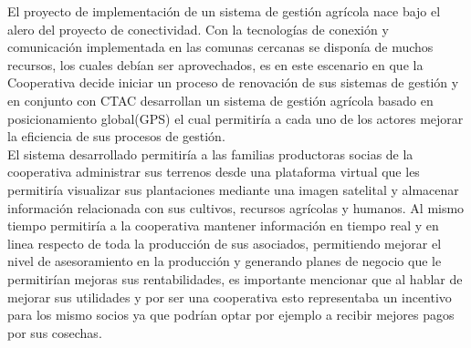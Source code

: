 El proyecto de implementación de un sistema de gestión agrícola nace bajo el alero del proyecto de conectividad. Con la tecnologías de conexión y comunicación implementada en las comunas cercanas se disponía de muchos recursos, los cuales debían ser aprovechados, es en este escenario en que la Cooperativa decide iniciar un proceso de renovación de sus sistemas de gestión y en conjunto con CTAC desarrollan un sistema de gestión agrícola basado en posicionamiento global(GPS) el cual permitiría a cada uno de los actores mejorar la eficiencia de sus procesos de gestión.\\

El sistema desarrollado permitiría a las familias productoras socias de la cooperativa administrar sus terrenos desde una plataforma virtual que les permitiría visualizar sus plantaciones mediante una imagen satelital y almacenar información relacionada con sus cultivos, recursos agrícolas y humanos. Al mismo tiempo permitiría a la cooperativa mantener información en tiempo real y en linea respecto de toda la producción de sus asociados, permitiendo mejorar el nivel de asesoramiento en la producción y generando planes de negocio que le permitirían mejoras sus rentabilidades, es importante mencionar que al hablar de mejorar sus utilidades y por ser una cooperativa esto representaba un incentivo para los mismo socios ya que podrían optar por ejemplo a recibir mejores pagos por sus cosechas.
